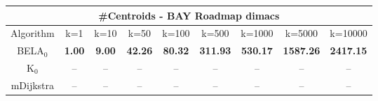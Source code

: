 \begin{tabular}{c|cccccccc}\toprule
\multicolumn{9}{c}{#Centroids - BAY Roadmap dimacs}\\ \midrule
Algorithm & k=1 & k=10 & k=50 & k=100 & k=500 & k=1000 & k=5000 & k=10000 \\ \midrule
BELA$_0$ & \textbf{1.00} & \textbf{9.00} & \textbf{42.26} & \textbf{80.32} & \textbf{311.93} & \textbf{530.17} & \textbf{1587.26} & \textbf{2417.15} \\
K$_0$ & -- & -- & -- & -- & -- & -- & -- & -- \\
mDijkstra & -- & -- & -- & -- & -- & -- & -- & -- \\ \bottomrule 
\end{tabular}

